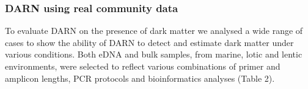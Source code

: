    \subsubsection*{DARN using real community data}

   To evaluate DARN on the presence of dark matter we analysed a wide range of cases to show the ability of DARN to detect and estimate dark matter under various conditions. 
   Both eDNA and bulk samples, from marine, lotic and lentic environments, were selected to reflect various combinations of primer and amplicon lengths, PCR protocols and bioinformatics analyses (Table 2).

   \begin{table}
      
      \begin{tabular}{@{}ccccccccccc@{}}
      

\end{tabular}
\end{table}
